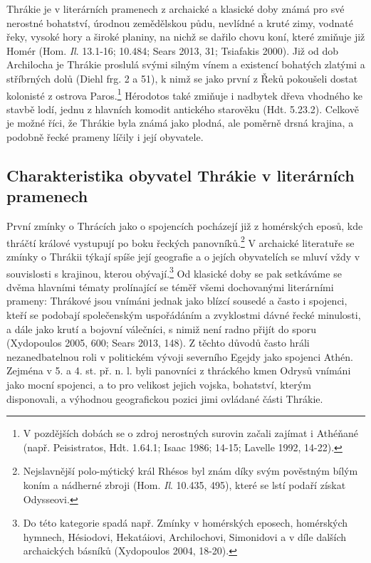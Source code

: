Thrákie je v literárních pramenech z archaické a klasické doby známá pro své nerostné bohatství, úrodnou zemědělskou půdu, nevlídné a kruté zimy, vodnaté řeky, vysoké hory a široké planiny, na nichž se dařilo chovu koní, které zmiňuje již Homér (Hom. {\em Il}. 13.1-16; 10.484; Sears 2013, 31; Tsiafakis 2000). Již od dob Archilocha je Thrákie proslulá svými silným vínem a existencí bohatých zlatými a stříbrných dolů (Diehl frg. 2 a 51), k nimž se jako první z Řeků pokoušeli dostat kolonisté z ostrova Paros.\footnote{V pozdějších dobách se o zdroj nerostných surovin začali zajímat i Athéňané (např. Peisistratos, Hdt. 1.64.1; Isaac 1986; 14-15; Lavelle 1992, 14-22).} Hérodotos také zmiňuje i nadbytek dřeva vhodného ke stavbě lodí, jednu z hlavních komodit antického starověku (Hdt. 5.23.2). Celkově je možné říci, že Thrákie byla známá jako plodná, ale poměrně drsná krajina, a podobně řecké prameny líčily i její obyvatele.

\subsection[charakteristika-obyvatel-thrákie-v-literárních-pramenech]{Charakteristika obyvatel Thrákie v literárních pramenech}

První zmínky o Thrácích jako o spojencích pocházejí již z homérských eposů, kde thráčtí králové vystupují po boku řeckých panovníků.\footnote{Nejslavnější polo-mýtický král Rhésos byl znám díky svým pověstným bílým koním a nádherné zbroji (Hom. {\em Il}. 10.435, 495), které se lstí podaří získat Odysseovi.} V archaické literatuře se zmínky o Thrákii týkají spíše její geografie a o jejích obyvatelích se mluví vždy v souvislosti s krajinou, kterou obývají.\footnote{Do této kategorie spadá např. Zmínky v homérských eposech, homérských hymnech, Hésiodovi, Hekatáiovi, Archilochovi, Simonidovi a v díle dalších archaických básníků (Xydopoulos 2004, 18-20).} Od klasické doby se pak setkáváme se dvěma hlavními tématy prolínající se téměř všemi dochovanými literárními prameny: Thrákové jsou vnímáni jednak jako blízcí sousedé a často i spojenci, kteří se podobají společenským uspořádáním a zvyklostmi dávné řecké minulosti, a dále jako krutí a bojovní válečníci, s nimiž není radno přijít do sporu (Xydopoulos 2005, 600; Sears 2013, 148). Z těchto důvodů často hráli nezanedbatelnou roli v politickém vývoji severního Egejdy jako spojenci Athén. Zejména v 5. a 4. st. př. n. l. byli panovníci z thráckého kmen Odrysů vnímáni jako mocní spojenci, a to pro velikost jejich vojska, bohatství, kterým disponovali, a výhodnou geografickou pozici jimi ovládané části Thrákie.


